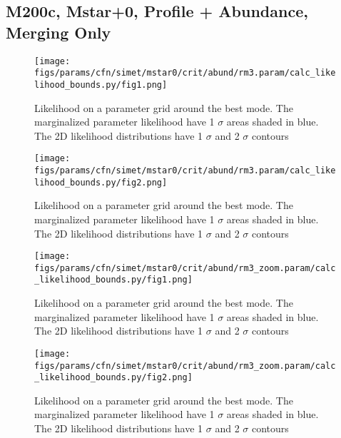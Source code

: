 \documentclass[twocolumn]{article}
\begin{document}
\subsection{M200c, Mstar+0, Profile + Abundance, Merging Only}
\begin{figure}[H]
  \center\texttt{[image: figs/params/cfn/simet/mstar0/crit/abund/rm3.param/calc\_likelihood\_bounds.py/fig1.png]}
  \caption{Likelihood on a parameter grid around the best mode. The marginalized parameter likelihood have
    1 $\sigma$ areas shaded in blue. The 2D likelihood distributions have 1 $\sigma$  and 2 $\sigma$ contours}
  \label{fig:basic_rd:likelihood}
\end{figure}

\begin{figure}[H]
  \center\texttt{[image: figs/params/cfn/simet/mstar0/crit/abund/rm3.param/calc\_likelihood\_bounds.py/fig2.png]}
  \caption{Likelihood on a parameter grid around the best mode. The marginalized parameter likelihood have
    1 $\sigma$ areas shaded in blue. The 2D likelihood distributions have 1 $\sigma$  and 2 $\sigma$ contours}
  \label{fig:basic_rd:likelihood}
\end{figure}

\begin{figure}[H]
  \center\texttt{[image: figs/params/cfn/simet/mstar0/crit/abund/rm3\_zoom.param/calc\_likelihood\_bounds.py/fig1.png]}
  \caption{Likelihood on a parameter grid around the best mode. The marginalized parameter likelihood have
    1 $\sigma$ areas shaded in blue. The 2D likelihood distributions have 1 $\sigma$  and 2 $\sigma$ contours}
  \label{fig:basic_rd:likelihood}
\end{figure}

\begin{figure}[H]
  \center\texttt{[image: figs/params/cfn/simet/mstar0/crit/abund/rm3\_zoom.param/calc\_likelihood\_bounds.py/fig2.png]}
  \caption{Likelihood on a parameter grid around the best mode. The marginalized parameter likelihood have
    1 $\sigma$ areas shaded in blue. The 2D likelihood distributions have 1 $\sigma$  and 2 $\sigma$ contours}
  \label{fig:basic_rd:likelihood}
\end{figure}
\end{document}
